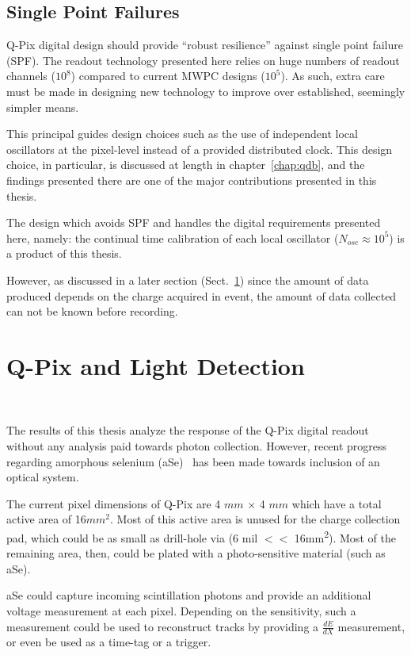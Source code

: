 \subsection{Single Point Failures}

Q-Pix digital design should provide  ``robust resilience'' against single point failure (SPF).
The readout technology presented here relies on huge numbers of readout channels ($10^{8}$) compared to current MWPC designs ($10^{5}$).
As such, extra care must be made in designing new technology to improve over established, seemingly simpler means.

This principal guides design choices such as the use of independent local oscillators at the pixel-level instead of a provided distributed clock.
This design choice, in particular, is discussed at length in chapter~\ref{chap:qdb}, and the findings presented there are one of the major contributions presented in this thesis.

The design which avoids SPF and handles the digital requirements presented here, namely: the continual time calibration of each local oscillator ($N_{osc} \approx 10^{5}$) is a product of this thesis.

However, as discussed in a later section (Sect.~\ref{}) since the amount of data produced depends on the charge acquired in event, the amount of data collected can not be known before recording.

\section{Q-Pix and Light Detection}~\label{sec:qpix_photonics}

The results of this thesis analyze the response of the Q-Pix digital readout without any analysis paid towards photon collection.
However, recent progress regarding amorphous selenium (aSe)~\citep{https://doi.org/10.48550/arxiv.2207.11127} has been made towards inclusion of an optical system.

The current pixel dimensions of Q-Pix are 4 $\unit{mm}$ $\times$ 4 $\unit{mm} $ which have a total active area of 16$\unit{mm^{2}}$.
Most of this active area is unused for the charge collection pad, which could be as small as drill-hole via (6 mil $<<$ 16\unit{mm^2}).
Most of the remaining area, then, could be plated with a photo-sensitive material (such as aSe).

aSe could capture incoming scintillation photons and provide an additional voltage measurement at each pixel.
Depending on the sensitivity, such a measurement could be used to reconstruct tracks by providing a $\frac{dE}{dX}$ measurement, or even be used as a time-tag or a trigger.

